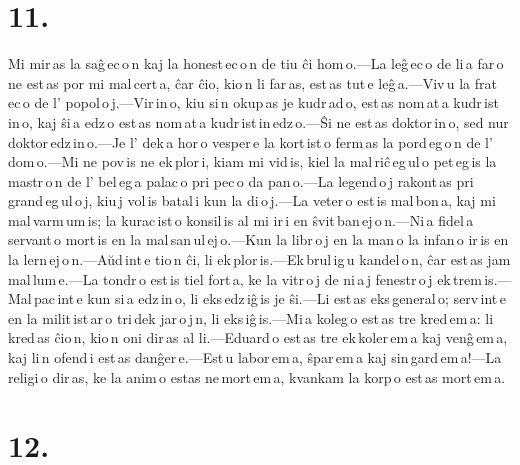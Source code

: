 \documentclass[ngerman,12pt,twoside]{book}
\begin{document}
\section*{11.}

Mi mir\,as la saĝ\,ec\,o\,n kaj la honest\,ec\,o\,n de tiu ĉi hom\,o.---La leĝ\,ec\,o de li\,a far\,o ne est\,as por mi mal\,cert\,a, ĉar ĉio, kio\,n li far\,as, est\,as tut\,e leĝ\,a.---Viv\,u la frat\,ec\,o de l' popol\,o\,j.---Vir\,in\,o, kiu si\,n okup\,as je kudr\,ad\,o, est\,as nom\,at\,a kudr\,ist\,in\,o, kaj ŝi\,a edz\,o est\,as nom\,at\,a kudr\,ist\,in\,edz\,o.---Ŝi ne est\,as doktor\,in\,o, sed nur doktor\,edz\,in\,o.---Je l' dek\,a hor\,o vesper\,e la kort\,ist\,o ferm\,as la pord\,eg\,o\,n de l' dom\,o.---Mi ne pov\,is ne ek\,plor\,i, kiam mi vid\,is, kiel la mal\,riĉ\,eg\,ul\,o pet\,eg\,is la mastr\,o\,n de l' bel\,eg\,a palac\,o pri pec\,o da pan\,o.---La legend\,o\,j rakont\,as pri grand\,eg\,ul\,o\,j, kiu\,j vol\,is batal\,i kun la di\,o\,j.---La veter\,o est\,is mal\,bon\,a, kaj mi mal\,varm\,um\,is; la kurac\,ist\,o konsil\,is al mi ir\,i en ŝvit\,ban\,ej\,o\,n.---Ni\,a fidel\,a servant\,o mort\,is en la mal\,san\,ul\,ej\,o.---Kun la libr\,o\,j en la man\,o la infan\,o ir\,is en la lern\,ej\,o\,n.---Aŭd\,int\,e tio\,n ĉi, li ek\,plor\,is.---Ek\,brul\,ig\,u kandel\,o\,n, ĉar est\,as jam mal\,lum\,e.---La tondr\,o est\,is tiel fort\,a, ke la vitr\,o\,j de ni\,a\,j fenestr\,o\,j ek\,trem\,is.---Mal\,pac\,int\,e kun si\,a edz\,in\,o, li eks\,edz\,iĝ\,is je ŝi.---Li est\,as eks\,general\,o; serv\,int\,e en la milit\,ist\,ar\,o tri\,dek jar\,o\,j\,n, li eks\,iĝ\,is.---Mi\,a koleg\,o est\,as tre kred\,em\,a: li kred\,as ĉio\,n, kio\,n oni dir\,as al li.---Eduard\,o est\,as tre ek\,koler\,em\,a kaj venĝ\,em\,a, kaj li\,n ofend\,i est\,as danĝer\,e.---Est\,u labor\,em\,a, ŝpar\,em\,a kaj sin\,gard\,em\,a!---La religi\,o dir\,as, ke la anim\,o estas ne\,mort\,em\,a, kvankam la korp\,o est\,as mort\,em\,a. 

\section*{12.}
\end{document}
